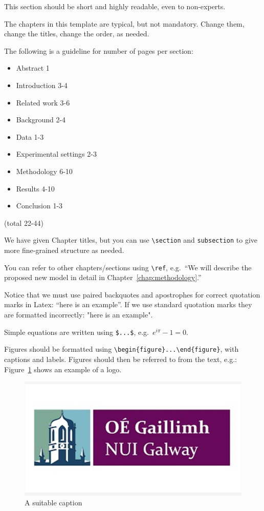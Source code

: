 \documentclass[oneside,12pt]{Classes/RoboticsLaTeX}
\begin{document}
This section should be short and highly readable, even to non-experts.

The chapters in this template are typical, but not mandatory. Change them, change the titles, change the order, as needed.

The following is a guideline for number of pages per section:\cite{cvaegan}

\begin{itemize}
\item Abstract 1
\item Introduction 3-4
\item Related work 3-6
\item Background 2-4
\item Data 1-3
\item Experimental settings 2-3
\item Methodology 6-10
\item Results 4-10
\item Conclusion 1-3
\end{itemize}

(total 22-44)

We have given Chapter titles, but you can use \verb+\section+ and \verb+subsection+ to give more fine-grained structure as needed.

You can refer to other chapters/sections using \verb+\ref+, e.g.~``We will describe the proposed new model in detail in Chapter~\ref{chap:methodology}.''

Notice that we must use paired backquotes and apostrophes for correct quotation marks in Latex: ``here is an example''. If we use standard quotation marks they are formatted incorrectly: "here is an example".

Simple equations are written using \verb+$...$+, e.g.~$e^{i\pi} - 1 = 0$.

Figures should be formatted using \verb+\begin{figure}...\end{figure}+, with captions and labels. Figures should then be referred to from the text, e.g.: Figure~\ref{fig:logo} shows an example of a logo.
\begin{figure}
    \centering
    \includegraphics[width=0.5\linewidth]{Figures/logo_NUI.png}
    \caption{A suitable caption}
    \label{fig:logo}
\end{figure}
\end{document}
